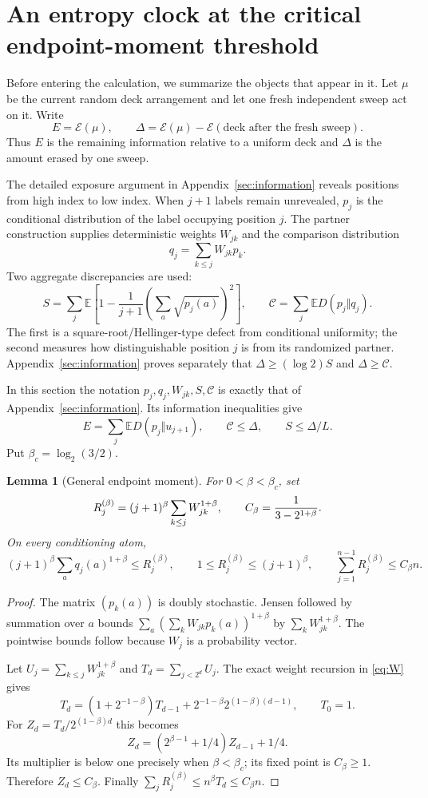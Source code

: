\documentclass[11pt]{article}
\numberwithin{equation}{section}
\newtheorem{lemma}[theorem]{Lemma}
\theoremstyle{definition}\newtheorem{definition}[theorem]{Definition}
\theoremstyle{remark}\newtheorem{remark}[theorem]{Remark}
\newcommand{\E}{\mathbb E}
\newcommand{\Ent}{\mathcal E}
\begin{document}
\section{An entropy clock at the critical endpoint-moment threshold}
Before entering the calculation, we summarize the objects that appear in it.
Let $\mu$ be the current random deck arrangement and let one fresh independent
sweep act on it.  Write
\[
 E=\Ent(\mu),\qquad
 \Delta=\Ent(\mu)-\Ent(\text{deck after the fresh sweep}).
\]
Thus $E$ is the remaining information relative to a uniform deck and $\Delta$
is the amount erased by one sweep.

The detailed exposure argument in Appendix~\ref{sec:information} reveals
positions from high index to low index.  When $j+1$ labels remain unrevealed,
$p_j$ is the conditional distribution of the label occupying position $j$.
The partner construction supplies deterministic weights $W_{jk}$ and the
comparison distribution
\[
 q_j=\sum_{k\le j}W_{jk}p_k.
\]
Two aggregate discrepancies are used:
\[
 S=\sum_j\E\!\left[1-\frac1{j+1}
       \left(\sum_a\sqrt{p_j(a)}\right)^2\right],
 \qquad
 \mathcal C=\sum_j\E D(p_j\Vert q_j).
\]
The first is a square-root/Hellinger-type defect from conditional uniformity;
the second measures how distinguishable position $j$ is from its randomized
partner.  Appendix~\ref{sec:information} proves separately that
$\Delta\ge(\log2)S$ and $\Delta\ge\mathcal C$.

In this section the notation $p_j,q_j,W_{jk},S,\mathcal C$ is exactly that
of Appendix~\ref{sec:information}. Its information inequalities give
\begin{equation}\label{eq:v4-losses}
 E=\sum_j\E D(p_j\Vert u_{j+1}),\qquad
 \mathcal C\le\Delta,\qquad S\le\Delta/L.
\end{equation}
Put $\beta_c=\log_2(3/2)$.

\begin{lemma}[General endpoint moment]\label{lem:beta-moment}
For $0<\beta<\beta_c$, set
\[
 R_j^{(\beta)}=(j+1)^\beta\sum_{k\le j}W_{jk}^{1+\beta},\qquad
 C_\beta={1\over3-2^{1+\beta}}.
\]
On every conditioning atom,
\[
 (j+1)^\beta\sum_a q_j(a)^{1+\beta}\le R_j^{(\beta)},\qquad
 1\le R_j^{(\beta)}\le(j+1)^\beta,
 \qquad \sum_{j=1}^{n-1}R_j^{(\beta)}\le C_\beta n.
\]
\end{lemma}
\begin{proof}
The matrix $(p_k(a))$ is doubly stochastic. Jensen followed by summation
over $a$ bounds $\sum_a(\sum_kW_{jk}p_k(a))^{1+\beta}$ by
$\sum_kW_{jk}^{1+\beta}$. The pointwise bounds follow because $W_j$ is a
probability vector.

Let $U_j=\sum_{k\le j}W_{jk}^{1+\beta}$ and
$T_d=\sum_{j<2^d}U_j$. The exact weight recursion in
\eqref{eq:W} gives
\[
 T_d=(1+2^{-1-\beta})T_{d-1}
             +2^{-1-\beta}2^{(1-\beta)(d-1)},\qquad T_0=1.
\]
For $Z_d=T_d/2^{(1-\beta)d}$ this becomes
\[
 Z_d=(2^{\beta-1}+1/4)Z_{d-1}+1/4.
\]
Its multiplier is below one precisely when $\beta<\beta_c$; its fixed
point is $C_\beta\ge1$. Therefore $Z_d\le C_\beta$. Finally
$\sum_jR_j^{(\beta)}\le n^\beta T_d\le C_\beta n$.
\end{proof}
\end{document}
